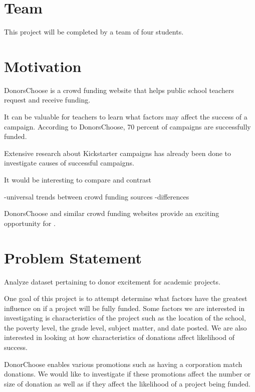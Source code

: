 \documentclass{article}
\begin{document}
 


\section{Team}
This project will be completed by a team of four students.

\section{Motivation}
DonorsChoose is a crowd funding website that helps public school teachers request and receive funding.  

It can be valuable for teachers to learn what factors may affect the success of a campaign.  
According to DonorsChoose, 70 percent of campaigns are successfully funded. 

Extensive research about Kickstarter campaigns has already been done to investigate causes of successful campaigns.  

It would be interesting to compare and contrast 

-universal trends between crowd funding sources
-differences 

DonorsChoose and similar crowd funding websites provide an exciting opportunity for .  

\section{Problem Statement}
Analyze dataset pertaining to donor excitement for academic projects. 

One goal of this project is to attempt determine what factors have the greatest influence on if a project will be fully funded.  Some factors we are interested in investigating is characteristics of the project such as the location of the school, the poverty level, the grade level, subject matter, and date posted.  We are also interested in looking at how characteristics of donations affect likelihood of success.

DonorChoose enables various promotions such as having a corporation match donations.  We would like to investigate if these promotions affect the number or size of donation as well as if they affect the likelihood of a project being funded.
\end{document}
